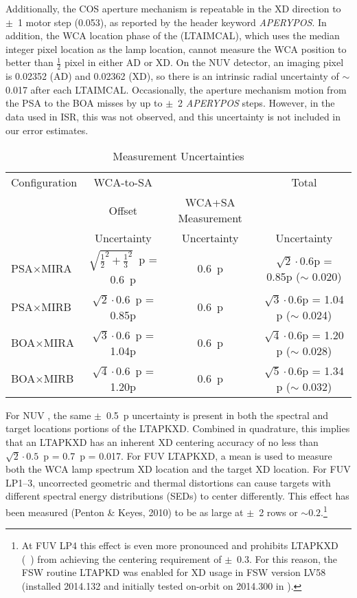 Additionally, the COS aperture mechanism is repeatable in the XD direction to $\pm$~1 motor step (0.053\arcsec{}), as reported by the header keyword \textit{APERYPOS}. In addition, the WCA location phase of the  (\textsc{LTAIMCAL}), which uses the median integer pixel location as the lamp location, cannot measure the WCA position to better than $\frac{1}{2}$ pixel in either AD or XD.
On the NUV detector, an imaging pixel is 0.02352\arcsec{} (AD) and 0.02362\arcsec{} (XD), so there is an intrinsic radial uncertainty of $\sim$0.017\arcsec{} after each \textsc{LTAIMCAL}.
Occasionally, the aperture mechanism motion from the PSA to the BOA misses by up to $\pm$~2 \textit{APERYPOS} steps. However, in the data used in ISR, this was not observed, and this uncertainty is not included in our error estimates.

\begin{table}[htb]
\centering
	\caption{ Measurement Uncertainties\label{tab:unc}}
	\begin{tabular}{lccc}
	\toprule
	Configuration &	  WCA-to-SA     	& \tacq{IMAGE}  & Total \\
				  &    Offset           & WCA+SA Measurement   & \tacq{IMAGE} \\
				  &  Uncertainty      &  Uncertainty   & Uncertainty \\
	\midrule
	PSA$\times$MIRA &	$\sqrt{\frac{1}{2}^2 + \frac{1}{3}^2 }$~p = 0.6~p	& 0.6~p	& $\sqrt{2} \cdot 0.6$p = 0.85p ($\sim$ 0.020\arcsec{}) \\
	PSA$\times$MIRB &	$\sqrt{2} \cdot 0.6$~p =	0.85p		& 0.6~p & $\sqrt{3} \cdot 0.6$p = 1.04 p ($\sim$ 0.024\arcsec{}) \\
	BOA$\times$MIRA &	$\sqrt{3} \cdot 0.6$~p =	1.04p		& 0.6~p & $\sqrt{4} \cdot 0.6$p = 1.20 p ($\sim$ 0.028\arcsec{}) \\
	BOA$\times$MIRB &	$\sqrt{4} \cdot 0.6$~p =	1.20p		& 0.6~p & $\sqrt{5} \cdot 0.6$p = 1.34 p ($\sim$ 0.032\arcsec{})\\
	\bottomrule
	\end{tabular}
\end{table}
For NUV , the same $\pm$~0.5~p uncertainty is present in both the spectral and target locations portions of the \textsc{LTAPKXD}. Combined in quadrature, this implies that
an \textsc{LTAPKXD} has an inherent XD centering accuracy of no less than $\sqrt{2} \cdot 0.5$~p = 0.7~p = 0.017\arcsec{}. For FUV \textsc{LTAPKXD}, a mean is used to measure both the WCA lamp spectrum XD location and the target XD location.
For FUV LP1--3, uncorrected geometric and thermal distortions can cause targets with different spectral energy distributions (SEDs) to center differently. This effect has been measured (Penton \& Keyes, 2010) to be as large at $\pm$~2 rows or
$\sim 0.2$\arcsec{}.\footnote{At FUV LP4 this effect is even more pronounced and prohibits \textsc{LTAPKXD} (\numposone~) from achieving the centering requirement of $\pm$~0.3\arcsec{}. For this reason, the  FSW routine \textsc{LTAPKD} was enabled
for XD usage in FSW version LV58 (installed 2014.132 and initially tested on-orbit on 2014.300 in ).}
